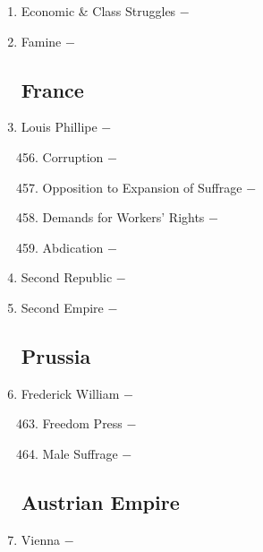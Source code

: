 \documentclass[12pt]{article}
\begin{document}
\begin{enumerate}
\item Economic \& Class Struggles $-$

\item Famine $-$

\subsection{France}

\item Louis Phillipe $-$ 

\begin{enumerate}[label=\arabic{*}.]
\setcounter{enumii}{455}

\item Corruption $-$ 

\item Opposition to Expansion of Suffrage $-$ 

\item Demands for Workers' Rights $-$ 

\item Abdication $-$

\end{enumerate}
\setcounter{enumi}{459}

\item Second Republic $-$ 

\item Second Empire $-$ 

\subsection{Prussia}

\item Frederick William $-$ 

\begin{enumerate}[label=\arabic{*}.]
\setcounter{enumii}{462}

\item Freedom Press $-$ 

\item Male Suffrage $-$ 

\end{enumerate}
\setcounter{enumi}{464}

\subsection{Austrian Empire}

\item Vienna $-$ 


\end{enumerate}
\end{document}
